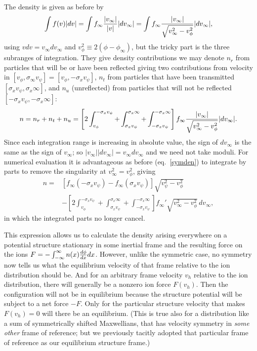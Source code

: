 \documentclass[12pt]{article}
\begin{document}
The density is given as before by 
\begin{equation}
\int f(v) |dv|=\int f_\infty {|v_\infty|\over |v|}   |dv_\infty| 
=\int  f_\infty {|v_\infty|\over \sqrt{v_\infty^2-v_\phi^2} }  |dv_\infty|, 
\end{equation}
using $vdv=v_\infty dv_\infty$ and
$v_\phi^2\equiv 2(\phi-\phi_\infty)$, but the tricky part is the three
subranges of integration. They give density contributions we may
denote $n_r$ from particles that will be or have been reflected giving two
contributions from
velocity in $[v_\phi,\sigma_\infty v_\psi]=[v_\phi,-\sigma_x v_\psi]$, $n_t$ from particles that have been
transmitted $[\sigma_xv_\psi,\sigma_x\infty]$, and $n_u$ (unreflected)
from particles that will not be reflected
$[-\sigma_xv_\psi,-\sigma_x\infty]$:
\begin{equation}
  n=n_r+n_t+n_u=\left[2\int_{v_\phi}^{-\sigma_x v_\psi}+\int_{\sigma_x v_\psi}^{\sigma_x\infty}
    +\int_{-\sigma_x v_\psi}^{-\sigma_x\infty}\right] 
  f_\infty {|v_\infty|\over \sqrt{v_\infty^2-v_\phi^2} }  |dv_\infty|.
\end{equation}
Since each integration range is increasing in absolute value, the sign
of $dv_\infty$ is the same as the sign of $v_\infty$; so
$|v_\infty||dv_\infty|= v_\infty dv_\infty$ and we need not take moduli.
For numerical evaluation it is advantageous as before (eq.\
\ref{symden}) to integrate by parts to
remove the singularity at $v_\infty^2=v_\phi^2$, giving 
\begin{equation}
\begin{split}
  n=&[f_\infty(-\sigma_xv_\psi)-f_\infty(\sigma_xv_\psi)]\sqrt{v_\psi^2-v_\phi^2}\\
  &-\left[2\int_{v_\phi}^{-\sigma_x v_\psi}+\int_{\sigma_x v_\psi}^{\sigma_x\infty}
    +\int_{-\sigma_x v_\psi}^{-\sigma_x\infty}\right]
  f_\infty'\sqrt{v_\infty^2-v_\phi^2}\, dv_\infty,
\end{split}
\end{equation}
in which the integrated parts no longer cancel.

This expression allows us to calculate the density arising everywhere
on a potential structure stationary in some inertial frame and the
resulting force on the ions
$F=-\int_{-\infty}^{\infty} n(x) {d\phi\over dx}dx$. However, unlike
the symmetric case, no symmetry now tells us what the equilibrium
velocity of that frame relative to the ion distribution should be. And
for an arbitrary frame velocity $v_h$ relative to the ion
distribution, there will generally be a nonzero ion force
$F(v_h)$. Then the configuration will not be in equilibrium because
the structure potential will be subject to a net force $-F$. Only for
the particular structure velocity that makes $F(v_h)=0$ will there be
an equilibrium.  (This is true also for a distribution like a sum of
symmetrically shifted Maxwellians, that has velocity symmetry in
\emph{some other} frame of reference; but we previously tacitly
adopted that particular frame of reference as our equilibrium
structure frame.)
\end{document}
